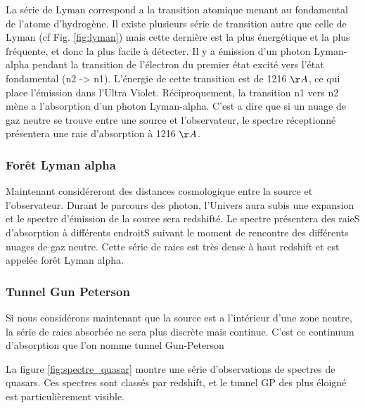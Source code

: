 La série de Lyman correspond a la transition atomique menant au fondamental de l'atome d'hydrogène.
Il existe plusieurs série de transition autre que celle de Lyman (cf Fig. \ref{fig:lyman}) mais cette dernière est la plus énergétique et la plus fréquente, et donc la plus facile à détecter.
Il y a émission d'un photon Lyman-alpha pendant la transition de l'électron du premier état excité vers l’état fondamental (n2 -> n1).
L'énergie de cette transition est de 1216 $\AA$,  ce qui place l’émission dans l'Ultra Violet.
Réciproquement, la transition n1 vers n2 mène a l'absorption d'un photon Lyman-alpha.
C'est a dire que si un nuage de gaz neutre se trouve entre une source et l'observateur, le spectre réceptionné présentera une raie d'absorption à 1216 $\AA$.

\subsubsection*{Forêt Lyman alpha}

Maintenant considéreront des distances cosmologique entre la source et l'observateur.
Durant le parcours des photon, l'Univers aura subis une expansion et le spectre d'émission de la source sera redshifté.
Le spectre présentera des raieS d’absorption à différents endroitS suivant le moment de rencontre des différents nuages de gaz neutre.
Cette série de raies est très dense à haut redshift et est appelée forêt Lyman alpha.

\subsubsection*{Tunnel Gun Peterson}

Si nous considérons maintenant que la source est a l’intérieur d'une zone neutre, la série de raies absorbée ne sera plus discrète mais continue.
C'est ce continuum d’absorption que l'on nomme tunnel Gun-Peterson \citep{1965ApJ...142.1633G}%

La figure \ref{fig:spectre_quasar} montre une série d'observations de spectres de quasars.
Ces spectres sont classés par redshift, et le tunnel GP des plus éloigné est particulièrement visible.


